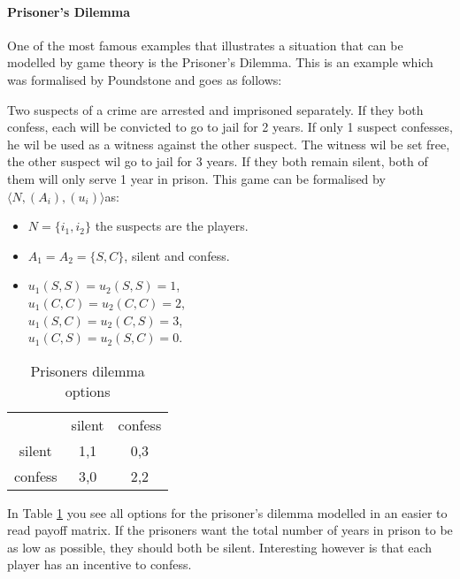 \paragraph{Prisoner's Dilemma}
One of the most famous examples that illustrates a situation that can be modelled by game theory is the Prisoner's Dilemma. This is an example which was formalised by Poundstone \cite{poundstone} and goes as follows: 

Two suspects of a crime are arrested and imprisoned separately. If they both confess, each will be convicted to go to jail for 2 years. If only 1 suspect confesses, he wil be used as a witness against the other suspect. The witness wil be set free, the other suspect wil go to jail for 3 years. If they both remain silent, both of them will only serve 1 year in prison. This game can be formalised by $\langle N, (A_i), (u_i) \rangle$as:
\begin{itemize}
	\item $N = \{i_{1}, i_{2} \}$ the suspects are the players.
    \item $A_1 = A_2 = \{S, C\}$, silent and confess.
    \item $u_1(S, S) = u_2(S, S) = 1$, \\
    $u_1(C, C) = u_2(C, C) = 2$, \\
    $u_1(S, C) = u_2(C, S) = 3$, \\
    $u_1(C, S) = u_2(S, C) = 0$.

\end{itemize}

\begin{table}[h]
\centering
\begin{tabular}{ccc}
                             & silent                   & confess                   \\ \cline{2-3} 
\multicolumn{1}{c|}{silent}  & \multicolumn{1}{c|}{1,1} & \multicolumn{1}{c|}{0,3} \\ \cline{2-3} 
\multicolumn{1}{c|}{confess} & \multicolumn{1}{c|}{3,0} & \multicolumn{1}{c|}{2,2} \\ \cline{2-3} 
\end{tabular}
\caption{Prisoners dilemma options}
\label{prisoners-d}
\end{table}

In Table \ref{prisoners-d} you see all options for the prisoner's dilemma modelled in an easier to read payoff matrix. 
If the prisoners want the total number of years in prison to be as low as possible, they should both be silent. Interesting however is that each player has an incentive to confess. 

